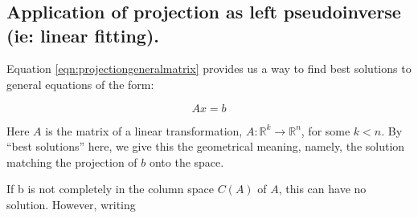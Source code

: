 \documentclass{article}      %
\title{} %
\author{Peeter Joot \quad peeter.joot@gmail.com}         %
\newcommand{\T}[0]{\text{T}}
\begin{document}

\maketitle{}

\section{}


















\subsection{ Application of projection as left pseudoinverse (ie: linear fitting). }


%




Equation \ref{eqn:projectiongeneralmatrix} provides us a way to find best solutions to general equations of the form:


\[
A x = b
\]

Here $A$ is the matrix of a linear transformation, $A : \mathbb{R}^k \rightarrow \mathbb{R}^n$, for some $k<n$.
By ``best solutions'' here, we give this the geometrical meaning, namely, the solution matching the projection of $b$ onto the space.

If b is not completely in the column space $C(A)$ of $A$, this can have no solution.  However, writing
\end{document}
